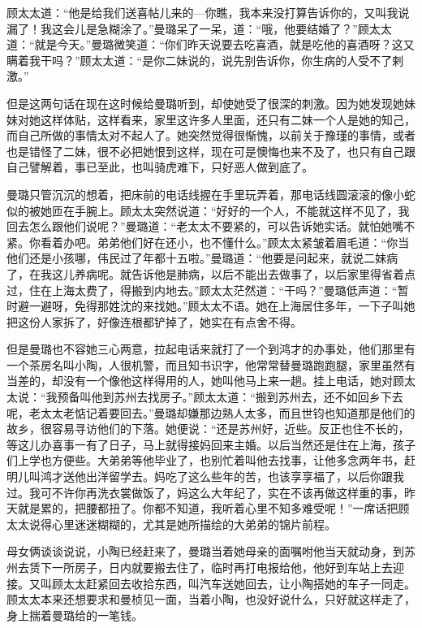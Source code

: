 \par 顾太太道：“他是给我们送喜帖儿来的—你瞧，我本来没打算告诉你的，又叫我说漏了！我这会儿是急糊涂了。”曼璐呆了一呆，道：“哦，他要结婚了？”顾太太道：“就是今天。”曼璐微笑道：“你们昨天说要去吃喜酒，就是吃他的喜酒呀？这又瞒着我干吗？”顾太太道：“是你二妹说的，说先别告诉你，你生病的人受不了剌激。”
\par 但是这两句话在现在这时候给曼璐听到，却使她受了很深的刺激。因为她发现她妹妹对她这样体贴，这样看来，家里这许多人里面，还只有二妹一个人是她的知己，而自己所做的事情太对不起人了。她突然觉得很惭愧，以前关于豫瑾的事情，或者也是错怪了二妹，很不必把她恨到这样，现在可是懊悔也来不及了，也只有自己跟自己譬解着，事已至此，也叫骑虎难下，只好恶人做到底了。
\par 曼璐只管沉沉的想着，把床前的电话线握在手里玩弄着，那电话线圆滚滚的像小蛇似的被她匝在手腕上。顾太太突然说道：“好好的一个人，不能就这样不见了，我回去怎么跟他们说呢？”曼璐道：“老太太不要紧的，可以告诉她实话。就怕她嘴不紧。你看着办吧。弟弟他们好在还小，也不懂什么。”顾太太紧皱着眉毛道：“你当他们还是小孩哪，伟民过了年都十五啦。”曼璐道：“他要是问起来，就说二妹病了，在我这儿养病呢。就告诉他是肺病，以后不能出去做事了，以后家里得省着点过，住在上海太费了，得搬到内地去。”顾太太茫然道：“干吗？”曼璐低声道：“暂时避一避呀，免得那姓沈的来找她。”顾太太不语。她在上海居住多年，一下子叫她把这份人家拆了，好像连根都铲掉了，她实在有点舍不得。
\par 但是曼璐也不容她三心两意，拉起电话来就打了一个到鸿才的办事处，他们那里有一个茶房名叫小陶，人很机警，而且知书识字，他常常替曼璐跑跑腿，家里虽然有当差的，却没有一个像他这样得用的人，她叫他马上来一趟。挂上电话，她对顾太太说：“我预备叫他到苏州去找房子。”顾太太道：“搬到苏州去，还不如回乡下去呢，老太太老惦记着要回去。”曼璐却嫌那边熟人太多，而且世钧也知道那是他们的故乡，很容易寻访他们的下落。她便说：“还是苏州好，近些。反正也住不长的，等这儿办喜事一有了日子，马上就得接妈回来主婚。以后当然还是住在上海，孩子们上学也方便些。大弟弟等他毕业了，也别忙着叫他去找事，让他多念两年书，赶明儿叫鸿才送他出洋留学去。妈吃了这么些年的苦，也该享享福了，以后你跟我过。我可不许你再洗衣裳做饭了，妈这么大年纪了，实在不该再做这样重的事，昨天就是累的，把腰都扭了。你都不知道，我听着心里不知多难受呢！”一席话把顾太太说得心里迷迷糊糊的，尤其是她所描绘的大弟弟的锦片前程。
\par 母女俩谈谈说说，小陶已经赶来了，曼璐当着她母亲的面嘱咐他当天就动身，到苏州去赁下一所房子，日内就要搬去住了，临时再打电报给他，他好到车站上去迎接。又叫顾太太赶紧回去收拾东西，叫汽车送她回去，让小陶搭她的车子一同走。顾太太本来还想要求和曼桢见一面，当着小陶，也没好说什么，只好就这样走了，身上揣着曼璐给的一笔钱。
